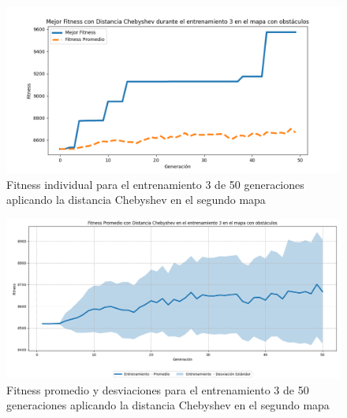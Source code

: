 \documentclass[lettersize, journal]{IEEEtran}
\begin{document}
\begin{figure}[H]
    \centering
    \includegraphics[width=0.9 \linewidth]{Chebyshev/Mapa2/Fitness_3_Map2_Cheby_50Gen.png}
    \caption{Fitness individual para el entrenamiento 3 de 50 generaciones aplicando la distancia Chebyshev en el segundo mapa}
    \label{fig:cheb_3_50_m2}
\end{figure}
\begin{figure}[H]
    \centering
    \includegraphics[width=0.9 \linewidth]{Chebyshev/Mapa2/Fitness_3_Map2_Cheby_50Gen_Sombra.png}
    \caption{Fitness promedio y desviaciones para el entrenamiento 3 de 50 generaciones aplicando la distancia Chebyshev en el segundo mapa}
    \label{fig:cheb_3_50_sombra_m2}
\end{figure}
\end{document}
